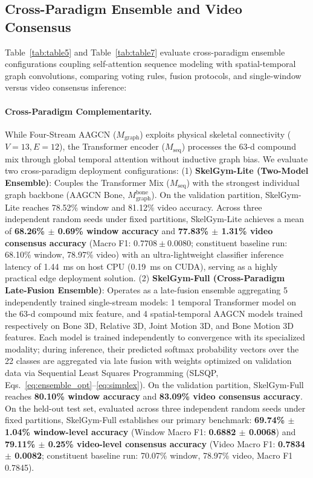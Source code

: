 \documentclass[runningheads]{llncs}
\begin{document}
\subsection{Cross-Paradigm Ensemble and Video Consensus}
Table~\ref{tab:table5} and Table~\ref{tab:table7} evaluate cross-paradigm ensemble configurations coupling self-attention sequence modeling with spatial-temporal graph convolutions, comparing voting rules, fusion protocols, and single-window versus video consensus inference:

\paragraph{Cross-Paradigm Complementarity.} While Four-Stream AAGCN ($M_{\text{graph}}$) exploits physical skeletal connectivity ($V=13, E=12$), the Transformer encoder ($M_{\text{seq}}$) processes the 63-d compound mix through global temporal attention without inductive graph bias. We evaluate two cross-paradigm deployment configurations:
(1) \textbf{SkelGym-Lite (Two-Model Ensemble)}: Couples the Transformer Mix ($M_{\text{seq}}$) with the strongest individual graph backbone (AAGCN Bone, $M_{\text{graph}}^{\text{bone}}$). On the validation partition, SkelGym-Lite reaches 78.52\% window and 81.12\% video accuracy. Across three independent random seeds under fixed partitions, SkelGym-Lite achieves a mean of \textbf{68.26\% $\pm$ 0.69\% window accuracy} and \textbf{77.83\% $\pm$ 1.31\% video consensus accuracy} (Macro F1: $0.7708 \pm 0.0080$; constituent baseline run: 68.10\% window, 78.97\% video) with an ultra-lightweight classifier inference latency of 1.44~ms on host CPU (0.19~ms on CUDA), serving as a highly practical edge deployment solution.
(2) \textbf{SkelGym-Full (Cross-Paradigm Late-Fusion Ensemble)}: Operates as a late-fusion ensemble aggregating 5 independently trained single-stream models: 1 temporal Transformer model on the 63-d compound mix feature, and 4 spatial-temporal AAGCN models trained respectively on Bone 3D, Relative 3D, Joint Motion 3D, and Bone Motion 3D features. Each model is trained independently to convergence with its specialized modality; during inference, their predicted softmax probability vectors over the 22 classes are aggregated via late fusion with weights optimized on validation data via Sequential Least Squares Programming (SLSQP, Eqs.~\eqref{eq:ensemble_opt}--\eqref{eq:simplex}). On the validation partition, SkelGym-Full reaches \textbf{80.10\% window accuracy} and \textbf{83.09\% video consensus accuracy}. On the held-out test set, evaluated across three independent random seeds under fixed partitions, SkelGym-Full establishes our primary benchmark: \textbf{69.74\% $\pm$ 1.04\% window-level accuracy} (Window Macro F1: \textbf{0.6882 $\pm$ 0.0068}) and \textbf{79.11\% $\pm$ 0.25\% video-level consensus accuracy} (Video Macro F1: \textbf{0.7834 $\pm$ 0.0082}; constituent baseline run: 70.07\% window, 78.97\% video, Macro F1 0.7845).
\end{document}
